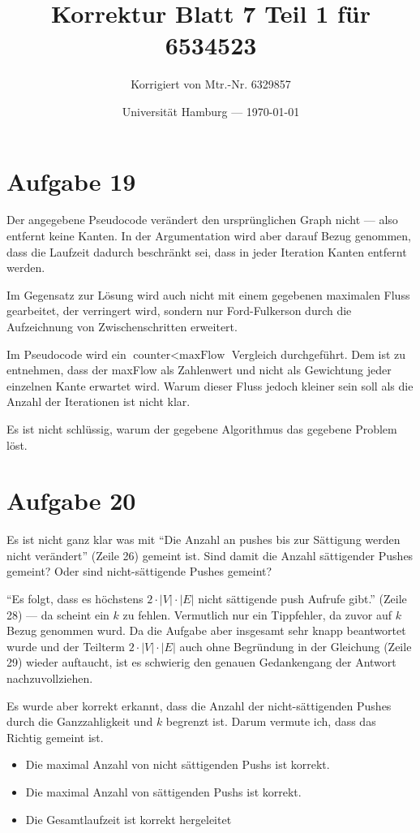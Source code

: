 \documentclass[parskip=half,a4paper]{scrartcl}
\title{Korrektur Blatt 7 Teil 1 für 6534523}
\author{Korrigiert von Mtr.-Nr. 6329857}
\date{Universität Hamburg --- \today}
\begin{document}
\maketitle %

\section{Aufgabe 19}

Der angegebene Pseudocode verändert den ursprünglichen Graph nicht --- also entfernt keine Kanten. In der Argumentation wird aber darauf Bezug genommen, dass die Laufzeit dadurch beschränkt sei, dass in jeder Iteration Kanten entfernt werden.

Im Gegensatz zur Lösung wird auch nicht mit einem gegebenen maximalen Fluss gearbeitet, der verringert wird, sondern nur Ford-Fulkerson durch die Aufzeichnung von Zwischenschritten erweitert.

Im Pseudocode wird ein $\text{counter} < \text{maxFlow}$ Vergleich durchgeführt. Dem ist zu entnehmen, dass der maxFlow als Zahlenwert und nicht als Gewichtung jeder einzelnen Kante erwartet wird. Warum dieser Fluss jedoch kleiner sein soll als die Anzahl der Iterationen ist nicht klar.

Es ist nicht schlüssig, warum der gegebene Algorithmus das gegebene Problem löst.

\section{Aufgabe 20}

Es ist nicht ganz klar was mit \enquote{Die Anzahl an pushes bis zur Sättigung werden nicht verändert} (Zeile 26) gemeint ist. Sind damit die Anzahl sättigender Pushes gemeint? Oder sind nicht-sättigende Pushes gemeint?

\enquote{Es folgt, dass es höchstens $2\cdot|V|\cdot|E|$ nicht sättigende push Aufrufe gibt.} (Zeile 28) --- da scheint ein $k$ zu fehlen. Vermutlich nur ein Tippfehler, da zuvor auf $k$ Bezug genommen wurd. Da die Aufgabe aber insgesamt sehr knapp beantwortet wurde und der Teilterm $2\cdot|V|\cdot|E|$ auch ohne Begründung in der Gleichung (Zeile 29) wieder auftaucht, ist es schwierig den genauen Gedankengang der Antwort nachzuvollziehen.

Es wurde aber korrekt erkannt, dass die Anzahl der nicht-sättigenden Pushes durch die Ganzzahligkeit und $k$ begrenzt ist. Darum vermute ich, dass das Richtig gemeint ist.

\begin{itemize}
    \item Die maximal Anzahl von nicht sättigenden Pushs ist korrekt.
    \item Die maximal Anzahl von sättigenden Pushs ist korrekt.
    \item Die Gesamtlaufzeit ist korrekt hergeleitet
\end{itemize}
\end{document}
